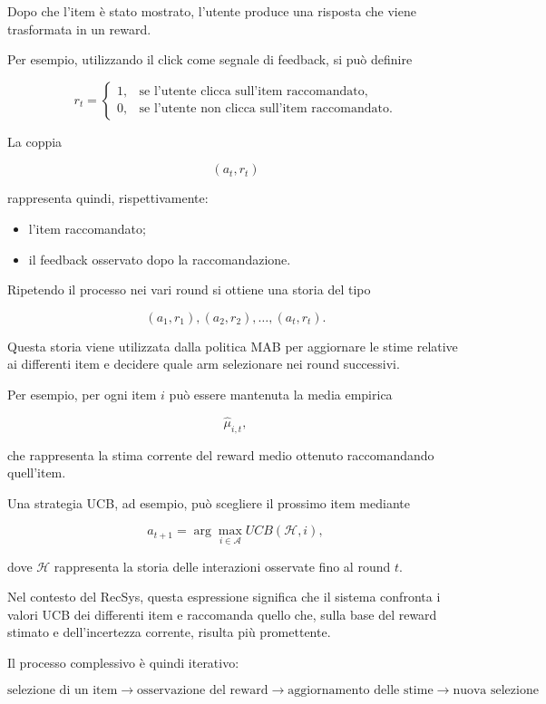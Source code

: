 Dopo che l'item è stato mostrato, l'utente produce una risposta che viene trasformata in un reward.

Per esempio, utilizzando il click come segnale di feedback, si può definire

\[
r_t=
\begin{cases}
1, & \text{se l'utente clicca sull'item raccomandato},\\
0, & \text{se l'utente non clicca sull'item raccomandato}.
\end{cases}
\]

La coppia

\[
(a_t,r_t)
\]

rappresenta quindi, rispettivamente:
\begin{itemize}
    \item l'item raccomandato;
    \item il feedback osservato dopo la raccomandazione.
\end{itemize}

Ripetendo il processo nei vari round si ottiene una storia del tipo

\[
(a_1,r_1),
(a_2,r_2),
\ldots,
(a_t,r_t).
\]

Questa storia viene utilizzata dalla politica MAB per aggiornare le stime relative ai differenti item e decidere quale arm selezionare nei round successivi.

Per esempio, per ogni item $i$ può essere mantenuta la media empirica

\[
\widehat{\mu}_{i,t},
\]

che rappresenta la stima corrente del reward medio ottenuto raccomandando quell'item.

Una strategia UCB, ad esempio, può scegliere il prossimo item mediante

\[
a_{t+1}
=
\arg\max_{i\in\mathcal A}
UCB(\mathcal H,i),
\]

dove $\mathcal H$ rappresenta la storia delle interazioni osservate fino al round $t$.

Nel contesto del RecSys, questa espressione significa che il sistema confronta i valori UCB dei differenti item e raccomanda quello che, sulla base del reward stimato e dell'incertezza corrente, risulta più promettente.

Il processo complessivo è quindi iterativo:

\[
\boxed{
\text{selezione di un item}
\rightarrow
\text{osservazione del reward}
\rightarrow
\text{aggiornamento delle stime}
\rightarrow
\text{nuova selezione}
}
\]

